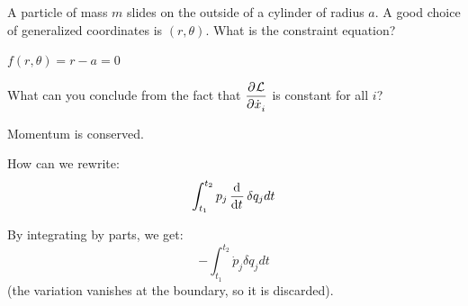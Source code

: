 \begin{p}
A particle of mass $m$ slides on the outside of a cylinder of radius $a$. A good choice of generalized coordinates is $(r, \theta)$. What is the constraint equation?
\end{p}
\begin{s}
$f(r,\theta) = r - a = 0$
\end{s}

\begin{p}
What can you conclude from the fact that $\dpd{\LL}{\dot{x}_i}$ is constant for all $i$?
\end{p}
\begin{s}
Momentum is conserved.
\end{s}

\begin{p}
How can we rewrite:
\[\int_{t_1}^{t_2}p_j\dod{}{t}\delta q_j dt\]
\end{p}
\begin{s}
By integrating by parts, we get:
\[-\int_{t_1}^{t_2}\dot{p}_j\delta q_j dt\]
(the variation vanishes at the boundary, so it is discarded).
\end{s}
